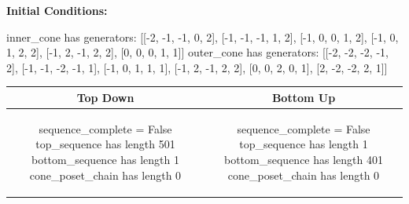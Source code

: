 \documentclass[10pt]{article}
\begin{document}
\textbf{Initial Conditions:}
\begin{SAGE}
inner_cone has generators: 
[[-2, -1, -1, 0, 2], [-1, -1, -1, 1, 2], [-1, 0, 0, 1, 2], [-1, 0, 1, 2, 2], [-1, 2, -1, 2, 2], [0, 0, 0, 1, 1]]
outer_cone has generators: 
[[-2, -2, -2, -1, 2], [-1, -1, -2, -1, 1], [-1, 0, 1, 1, 1], [-1, 2, -1, 2, 2], [0, 0, 2, 0, 1], [2, -2, -2, 2, 1]]

\end{SAGE}
\begin{tabular}{c|c}
\textbf{Top Down} & \textbf{Bottom Up} \\ \hline  
\begin{SAGE}
sequence_complete = False
top_sequence has length 501
bottom_sequence has length 1
cone_poset_chain has length 0
\end{SAGE} 
&
\begin{SAGE}
sequence_complete = False
top_sequence has length 1
bottom_sequence has length 401
cone_poset_chain has length 0
\end{SAGE} 
\\ \hline


\end{tabular}
\end{document}
